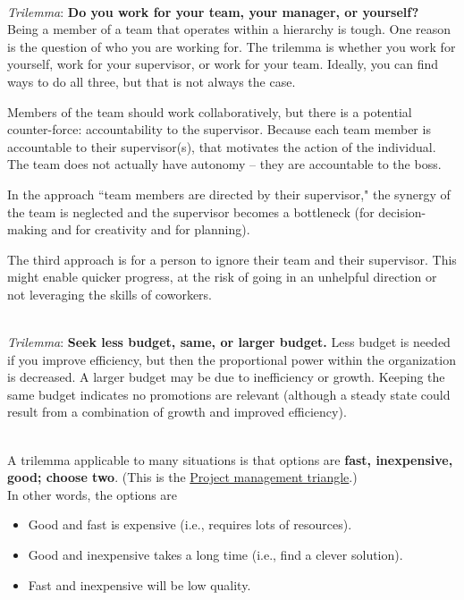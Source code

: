 \ \\

\textit{Trilemma}: \textbf{Do you work for your team, your manager, or yourself?} \\
Being a member of a team that operates within a hierarchy is tough. One reason is the question of who you are working for. The trilemma is whether you work for yourself, work for your supervisor, or work for your team.  Ideally, you can find ways to do all three, but that is not always the case. 

Members of the team should work collaboratively, but there is a potential counter-force: accountability to the supervisor. Because each team member is accountable to their supervisor(s), that motivates the action of the individual. The team does not actually have autonomy -- they are accountable to the boss.

In the approach ``team members are directed by their supervisor," the synergy of the team is neglected and the supervisor becomes a bottleneck (for decision-making and for creativity and for planning).

The third approach is for a person to ignore their team and their supervisor. This might enable quicker progress, at the risk of going in an unhelpful direction or not leveraging the skills of coworkers. 

\ \\

\textit{Trilemma}:
\textbf{Seek less budget, same, or larger budget.} 
Less budget is needed if you improve efficiency, but then the proportional power within the organization is decreased. A larger budget may be due to inefficiency or growth. Keeping the same budget indicates no promotions are relevant (although a steady state could result from a combination of growth and improved efficiency). 

\ \\

A trilemma applicable to many situations is that options are \textbf{fast, inexpensive, good; choose two}. 
(This is the \href{https://en.wikipedia.org/wiki/Project_management_triangle}{Project management triangle}.) 
\\
In other words, the options are
\begin{itemize}
    \item Good and fast is expensive (i.e., requires lots of resources).
    \item Good and inexpensive takes a long time (i.e., find a clever solution).
    \item Fast and inexpensive will be low quality.
\end{itemize}

